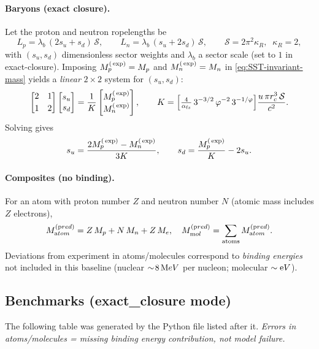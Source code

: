 \documentclass[11pt]{article}
\begin{document}
\paragraph{Baryons (exact closure).}
    Let the proton and neutron ropelengths be
    \[
        L_p=\lambda_b\,(2s_u+s_d)\,\mathcal S,\qquad
        L_n=\lambda_b\,(s_u+2s_d)\,\mathcal S,\qquad
        \mathcal S=2\pi^2\kappa_R,\;\;\kappa_R=2,
    \]
    with $(s_u,s_d)$ dimensionless sector weights and $\lambda_b$ a sector scale (set to $1$ in exact-closure).
    Imposing $M_p^{\textrm(\exp)}=M_p$ and $M_n^{\textrm(\exp)}=M_n$ in \eqref{eq:SST-invariant-mass} yields a \emph{linear} $2\times2$ system for $(s_u,s_d)$:
    \[
        \begin{bmatrix}
        2 & 1\\[2pt]
        1 & 2
        \end{bmatrix}
        \begin{bmatrix}
        s_u\\ s_d
        \end{bmatrix}

        =
        \frac{1}{K}
        \begin{bmatrix}
        M_p^{\textrm(\exp)}\\ M_n^{\textrm(\exp)}
        \end{bmatrix},
        \qquad
        K=\Big[\tfrac{4}{\alpha_{\textrm fs}}\,3^{-3/2}\,\varphi^{-2}\,3^{-1/\varphi}\Big]\frac{u\,\pi r_c^3\,\mathcal S}{c^2}.
    \]
    Solving gives
    \[
        s_u=\frac{2M_p^{\textrm(\exp)}-M_n^{\textrm(\exp)}}{3K},
        \qquad
        s_d=\frac{M_p^{\textrm(\exp)}}{K}-2s_u.
    \]

\paragraph{Composites (no binding).}
    For an atom with proton number $Z$ and neutron number $N$ (atomic mass includes $Z$ electrons),
    \[
        M_{\textrm atom}^{(\textrm pred)} = Z\,M_p+N\,M_n+Z\,M_e,\quad
        M_{\textrm mol}^{(\textrm pred)}=\sum_{\text{atoms}}M_{\textrm atom}^{(\textrm pred)}.
    \]
    Deviations from experiment in atoms/molecules correspond to \emph{binding energies} not included in this baseline (nuclear $\sim\!8\,{\textrm MeV}$ per nucleon; molecular $\sim{\textrm eV}$).

\subsection{Benchmarks (exact\_closure mode)}
\label{sec:benchmarks-exact-closure}
The following table was generated by the Python file listed after it.
\emph{Errors in atoms/molecules = missing binding energy contribution, not model failure.}
\end{document}
